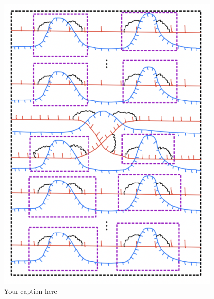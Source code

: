 \begin{figure}[H] %
    \centering
    \includegraphics[width=\linewidth]{diagrams/theorem12/3.png} %
    \caption{Your caption here}
    \label{fig:your-label}
\end{figure}

